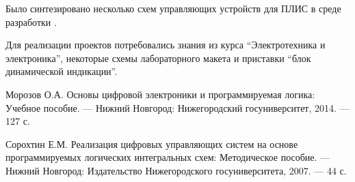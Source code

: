 Было синтезировано несколько схем управляющих устройств для ПЛИС  в среде разработки .

Для реализации проектов потребовались знания из курса \enquote{Электротехника и электроника}, некоторые схемы лабораторного макета и приставки \enquote{блок динамической индикации}.

\begin{thebibliography}{9}

  Морозов О.А.
  Основы цифровой электроники и программируемая логика: Учебное пособие. ---
  Нижний Новгород: Нижегородский госуниверситет,
  2014. ---
  127 с.

  Сорохтин Е.М.
  Реализация цифровых управляющих систем на основе программируемых логических интегральных схем: Методическое пособие. ---
  Нижний Новгород: Издательство Нижегородского госуниверситета,
  2007. ---
  44 с.
\end{thebibliography}